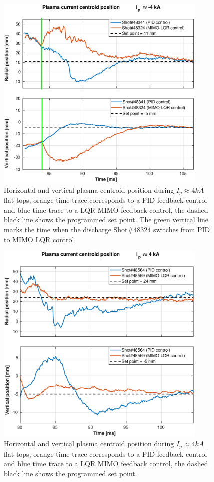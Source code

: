 \begin{figure}[h]
	\centering
	\includegraphics[width=0.9\textwidth]{Chp5/PIDvsMIMO_341_324_2.eps}
	\caption{ Horizontal and vertical plasma centroid position during  $I_p\approx 4kA$  flat-tops, orange time trace corresponds to a PID feedback control and blue time trace to a LQR MIMO feedback control, the dashed black line shows the programmed set point. The green vertical line marks the time  when the  discharge Shot$\# 48324$ switches  from PID to MIMO LQR control.	\label{341_342}}
\end{figure}


\begin{figure}[h]
	\centering
	\includegraphics[width=0.9\textwidth]{Chp5/PIDvsMIMO_564_559_2.eps}
	\caption{ Horizontal and vertical plasma centroid position during  $I_p\approx 4kA$  flat-tops, orange time trace corresponds to a PID feedback control and blue time trace to a LQR MIMO feedback control, the dashed black line shows the programmed set point. \label{564_559}}
\end{figure}





